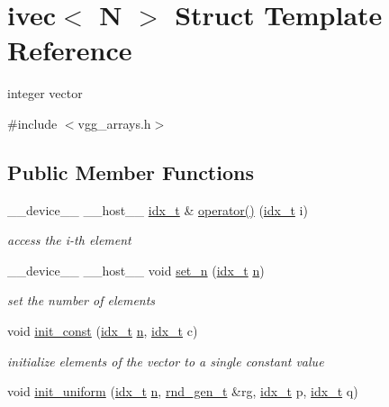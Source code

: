 \hypertarget{structivec}{}\section{ivec$<$ N $>$ Struct Template Reference}
\label{structivec}


integer vector  




{\ttfamily \#include $<$vgg\+\_\+arrays.\+h$>$}

\subsection*{Public Member Functions}
\begin{DoxyCompactItemize}
\item 
\+\_\+\+\_\+device\+\_\+\+\_\+ \+\_\+\+\_\+host\+\_\+\+\_\+ \hyperlink{vgg__util_8h_a8e93478a00e685bea5e6a3f617bf03a3}{idx\+\_\+t} \& \hyperlink{structivec_a54625e9b81da8a7aa7756e84a5f79e6f}{operator()} (\hyperlink{vgg__util_8h_a8e93478a00e685bea5e6a3f617bf03a3}{idx\+\_\+t} i)
\begin{DoxyCompactList}\small\item\em access the i-\/th element \end{DoxyCompactList}\item 
\+\_\+\+\_\+device\+\_\+\+\_\+ \+\_\+\+\_\+host\+\_\+\+\_\+ void \hyperlink{structivec_a7bbd67af13e22712f34a954e45f7ab81}{set\+\_\+n} (\hyperlink{vgg__util_8h_a8e93478a00e685bea5e6a3f617bf03a3}{idx\+\_\+t} \hyperlink{structivec_ad067032ec2cffe11fddfa932aa2380d1}{n})
\begin{DoxyCompactList}\small\item\em set the number of elements \end{DoxyCompactList}\item 
void \hyperlink{structivec_a1bf61db14d42b86afa9e0823fd351624}{init\+\_\+const} (\hyperlink{vgg__util_8h_a8e93478a00e685bea5e6a3f617bf03a3}{idx\+\_\+t} \hyperlink{structivec_ad067032ec2cffe11fddfa932aa2380d1}{n}, \hyperlink{vgg__util_8h_a8e93478a00e685bea5e6a3f617bf03a3}{idx\+\_\+t} c)
\begin{DoxyCompactList}\small\item\em initialize elements of the vector to a single constant value \end{DoxyCompactList}\item 
void \hyperlink{structivec_ad2dda0297da5553e346c97cad62fd23e}{init\+\_\+uniform} (\hyperlink{vgg__util_8h_a8e93478a00e685bea5e6a3f617bf03a3}{idx\+\_\+t} \hyperlink{structivec_ad067032ec2cffe11fddfa932aa2380d1}{n}, \hyperlink{structrnd__gen__t}{rnd\+\_\+gen\+\_\+t} \&rg, \hyperlink{vgg__util_8h_a8e93478a00e685bea5e6a3f617bf03a3}{idx\+\_\+t} p, \hyperlink{vgg__util_8h_a8e93478a00e685bea5e6a3f617bf03a3}{idx\+\_\+t} q)

\end{DoxyCompactItemize}
